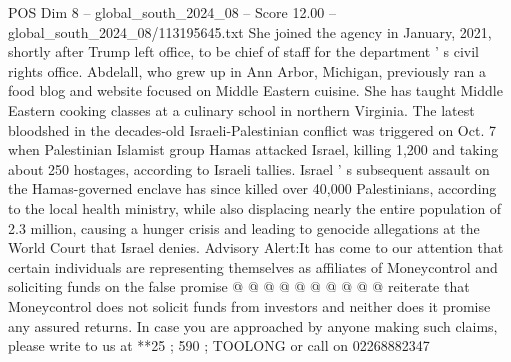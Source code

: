 \begin{textsample}{POS Dim 8 – global\_south\_2024\_08 – Score 12.00 – global\_south\_2024\_08/113195645.txt}
She joined the agency in January, 2021, shortly after Trump left office, to be chief of staff for the department ' s civil rights office.
Abdelall, who grew up in Ann Arbor, Michigan, previously ran a food blog and website focused on Middle Eastern cuisine.
She has taught Middle Eastern cooking classes at a culinary school in northern Virginia.
The latest bloodshed in the decades-old Israeli-Palestinian conflict was triggered on Oct. 7 when Palestinian Islamist group Hamas attacked Israel, killing 1,200 and taking about 250 hostages, according to Israeli tallies.
Israel ' s subsequent assault on the Hamas-governed enclave has since killed over 40,000 Palestinians, according to the local health ministry, while also displacing nearly the entire population of 2.3 million, causing a hunger crisis and leading to genocide allegations at the World Court that Israel denies.
Advisory Alert:It has come to our attention that certain individuals are representing themselves as affiliates of Moneycontrol and soliciting funds on the false promise @ @ @ @ @ @ @ @ @ @ reiterate that Moneycontrol does not solicit funds from investors and neither does it promise any assured returns.
In case you are approached by anyone making such claims, please write to us at **25 ; 590 ; TOOLONG or call on 02268882347

\end{textsample}
